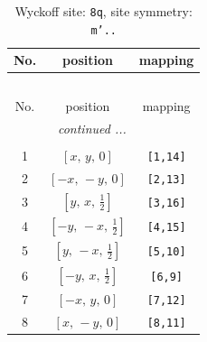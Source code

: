 \documentclass[fleqn,8pt]{jsarticle}
\begin{document}
\begin{longtable}{ccc}
\caption{Wyckoff site: {\tt 8q}, site symmetry: {\tt m'..}}
 \\
 \hline \hline
No. & position & mapping \\ \hline \endfirsthead

\multicolumn{2}{l}{\tablename\ \thetable{}} \\
 \hline \hline
No. & position & mapping \\ \hline \endhead

 \hline \hline
\multicolumn{2}{r}{\footnotesize\it continued ...} \\ \endfoot

 \hline \hline
\multicolumn{2}{r}{} \\ \endlastfoot

1 & $\left[ x,\, y,\, 0 \right]$ & {\tt [1,14]} \\ \hline
2 & $\left[ - x,\, - y,\, 0 \right]$ & {\tt [2,13]} \\ \hline
3 & $\left[ y,\, x,\, \frac{1}{2} \right]$ & {\tt [3,16]} \\ \hline
4 & $\left[ - y,\, - x,\, \frac{1}{2} \right]$ & {\tt [4,15]} \\ \hline
5 & $\left[ y,\, - x,\, \frac{1}{2} \right]$ & {\tt [5,10]} \\ \hline
6 & $\left[ - y,\, x,\, \frac{1}{2} \right]$ & {\tt [6,9]} \\ \hline
7 & $\left[ - x,\, y,\, 0 \right]$ & {\tt [7,12]} \\ \hline
8 & $\left[ x,\, - y,\, 0 \right]$ & {\tt [8,11]} \\
\end{longtable}
\renewcommand{\arraystretch}{1.2}
\end{document}
